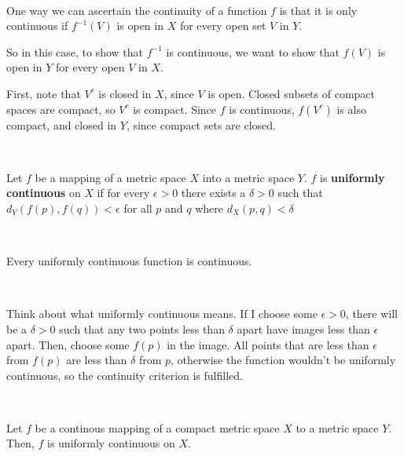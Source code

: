 \documentclass{article}
\begin{document}
\begin{customproof}
\

One way we can ascertain the continuity of a function $f$ is that it is only continuous if $f ^{-1} (V)$ is open in $X$ for every open set $V$ in $Y$.

So in this case, to show that $f^{-1}$ is continuous, we want to show that $f(V)$ is open in $Y$ for every open $V$ in $X$.

First, note that $V^c$ is closed in $X$, since $V$ is open. Closed subsets of compact spaces are compact, so $V^c$ is compact. Since $f$ is continuous, $f(V^c)$ is also compact, and closed in $Y$, since compact sets are closed. 
\end{customproof}

\begin{definition}
\

Let $f$ be a mapping of a metric space $X$ into a metric space $Y$. $f$ is \textbf{uniformly continuous} on $X$ if for every $\epsilon > 0$ there exists a $\delta > 0$ such that $d_Y(f(p), f(q)) < \epsilon$ for all $p$ and $q$ where $d_X(p,q) < \delta$ 
\end{definition}

\begin{theorem}
\

Every uniformly continuous function is continuous.
\end{theorem}

\begin{customproof}
\

Think about what uniformly continuous means. If I choose some $\epsilon > 0$, there will be a $\delta > 0$ such that any two points less than $\delta$ apart have images less than $\epsilon$ apart. Then, choose some $f(p)$ in the image. All points that are less than $\epsilon$ from $f(p)$ are less than $\delta$ from $p$, otherwise the function wouldn't be uniformly continuous, so the continuity criterion is fulfilled.
\end{customproof}

\begin{theorem}
\

Let $f$ be a continous mapping of a compact metric space $X$ to a metric space $Y$. Then, $f$ is uniformly continuous on $X$. 
\end{theorem}
\end{document}
